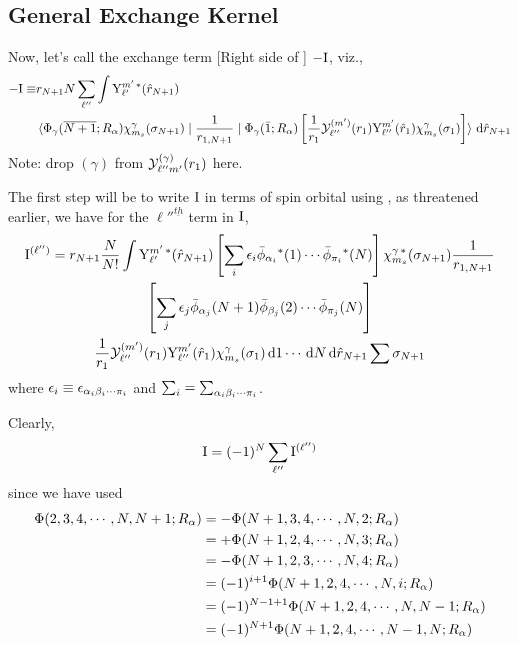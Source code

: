 \documentclass[aps,pra,groupedaddress,12pt,
               amsfonts,amssymb,
               preprint
    ]{revtex4}
\begin{document}
\subsection{General Exchange Kernel}
\label{sec:gener-exch-kern}
Now, let's call the exchange term [Right side of ] $-\mathrm{I}$,
viz.,
\begin{equation}
  \label{eq:Iex}
  \begin{split}
  -\mathrm{I} \equiv & r_{N+1}N\sum_{\ell''}\int\mathrm{Y}_{\ell'}^{m'\,*}(\hat{r}_{N+1}) \\
     & \mathinner{\langle{{\Phi_\gamma(\overline{N+1};R_\alpha)\chi_{m_s}^{\gamma}(\sigma_{N+1})} \mid {\dfrac{1}{r_{1,N+1}}} \mid {\Phi_\gamma(\bar{1};R_\alpha)\left[\dfrac{1}{r_1}\mathcal{Y}_{\ell''}^{(m')}(r_1)\mathrm{Y}_{\ell''}^{m'}(\hat{r}_1)\chi_{m_s}^{\gamma}(\sigma_1)\right]}}\rangle}\,\mathrm{d}\hat{r}_{N+1} 
 \end{split}
\end{equation}
Note: drop $(\gamma)$ from $\mathcal{Y}_{\ell''m'}^{(\gamma)}(r_1)$ here.

The first step will be to write $\mathrm{I}$ in terms of spin orbital using
, as threatened earlier, we have for the $\ell''^{\underline{th}}$
term in $\mathrm{I}$,
\begin{multline}
  \label{eq:Iexll}
    \mathrm{I}^{(\ell'')} =
    r_{N+1}\dfrac{N}{N!}\int\mathrm{Y}_{\ell'}^{m'\,*}(\hat{r}_{N+1})
     \left[\sum_i\epsilon_i\bar{\phi}_{\alpha_i}{}^*(1)\cdots\bar{\phi}_{\pi_i}{}^*(N)\right]\chi_{m_s}^{\gamma\,*}(\sigma_{N+1})\dfrac{1}{r_{1,N+1}}\\
     \left[\sum_j\epsilon_j\bar{\phi}_{\alpha_j}(N+1)\bar{\phi}_{\beta_j}(2)\cdots\bar{\phi}_{\pi_j}(N)\right] \\
     \dfrac{1}{r_1}\mathcal{Y}_{\ell''}^{(m')}(r_1)\mathrm{Y}_{\ell''}^{m'}(\hat{r}_1)\chi_{m_s}^{\gamma}(\sigma_1)\,\mathrm{d} 1\cdots\,\mathrm{d} N\,\mathrm{d}\hat{r}_{N+1}\sum\sigma_{N+1}
\end{multline}
where $\epsilon_i\equiv\epsilon_{{\alpha_i\beta_i\cdots\pi_i}}$ and $\sum_i=\sum_{{\alpha_i\beta_i\cdots\pi_i}}$.

Clearly, 
\begin{equation}
  \label{eq:Iexa}
  \mathrm{I} = (-1)^{N}\sum_{\ell''} \mathrm{I}^{(\ell'')}
\end{equation}
since we have used 
\begin{equation*}
  \begin{split}
    \Phi(2,3,4,\cdots,N,N+1;R_\alpha) & = -\Phi(N+1,3,4,\cdots,N,2;R_\alpha) \\
                                & = +\Phi(N+1,2,4,\cdots,N,3;R_\alpha) \\
                                & = -\Phi(N+1,2,3,\cdots,N,4;R_\alpha) \\
                                & = (-1)^{i+1}\Phi(N+1,2,4,\cdots,N,i;R_\alpha) \\
                                & = (-1)^{N-1+1}\Phi(N+1,2,4,\cdots,N,N-1;R_\alpha) \\
                                & = (-1)^{N+1}\Phi(N+1,2,4,\cdots,N-1,N;R_\alpha)
  \end{split}
\end{equation*}
\end{document}
